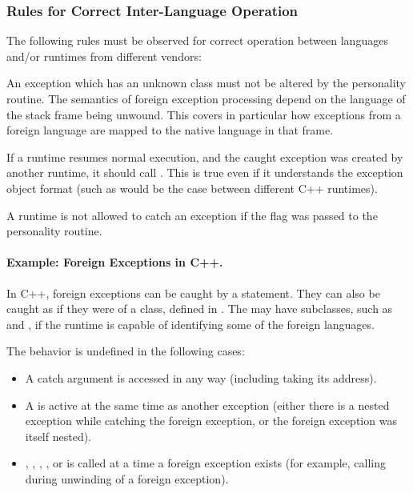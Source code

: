 \subsubsection{Rules for Correct Inter-Language Operation}

The following rules must be observed for correct operation between
languages and/or runtimes from different vendors:

An exception which has an unknown class must not be altered by the
personality routine. The semantics of foreign exception processing
depend on the language of the stack frame being unwound. This covers
in particular how exceptions from a foreign language are mapped to
the native language in that frame.

If a runtime resumes normal execution, and the caught exception was
created by another runtime, it should call .
This is true even if it understands the exception object format
(such as would be the case between different C++ runtimes).

A runtime is not allowed to catch an exception if the
 flag was passed to the personality routine.

\paragraph{Example: Foreign Exceptions in C++.} In C++, foreign exceptions can be
caught by a  statement. They can also be caught as if they
were of a  class, defined in . The
 may have subclasses, such as
 and , if the runtime is capable
of identifying some of the foreign languages.

The behavior is undefined in the following cases:
\begin{itemize}
\item A  catch argument is accessed in any way
     (including taking its address).

\item A  is active at the same time as another
     exception (either there is a nested exception while catching the
     foreign exception, or the foreign exception was itself nested).

\item {}, ,
     , , or
      is called at a time a foreign exception
     exists (for example, calling  during
     unwinding of a foreign exception).
\end{itemize}

